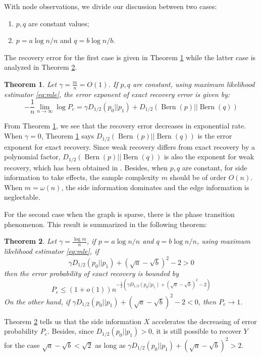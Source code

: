 \documentclass[conference]{IEEEtran}
\newtheorem{theorem}{Theorem}
\DeclareMathOperator{\Bern}{Bern}
\begin{document}
With node observations, we divide our discussion between two cases:
\begin{enumerate}
\item $p,q$ are constant values;
\item $p = a \log n /n$ and $q = b \log n / b$.
\end{enumerate}
The recovery error for the first case is given in Theorem \ref{thm:constant} while
the latter case is analyzed in Theorem \ref{thm:Pe}.
\begin{theorem}\label{thm:constant}
	Let $\gamma = \frac{m}{n} = O(1)$. If $p,q$ are constant, using maximum likelihood estimator \eqref{eq:mle},
	the error exponent of exact recovery error is given by:
	\begin{equation}
	-\frac{1}{n}\lim_{n\to \infty} \log P_e =  \gamma D_{1/2}(p_0 || p_1) + D_{1/2}(\Bern(p)||\Bern(q))
	\end{equation} 
\end{theorem}
From Theorem \ref{thm:constant}, we see that the recovery error decreases in exponential rate.
When $\gamma=0$, Theorem \ref{thm:constant} says $D_{1/2}(\Bern(p)||\Bern(q))$
is the error exponent for exact recovery. Since weak recovery differs from exact recovery by a polynomial factor, $D_{1/2}(\Bern(p)||\Bern(q))$ is also the exponent for weak recovery, which has been obtained
in \cite{zhang2016}. Besides, when $p,q$ are constant, for side information to take effects, the sample complexity $m$ should be of order $O(n)$. When $m=\omega(n)$, the side information dominates and the edge information is neglectable.

For the second case when the graph is sparse, there is the phase transition phenomenon. This result
is summarized
in the following theorem:
\begin{theorem}\label{thm:Pe}
Let $\gamma = \frac{\log m}{n}$, if $p = a \log n /n$ and $q = b \log n / n$, using maximum likelihood estimator \eqref{eq:mle},
if
\begin{equation}\label{eq:positive_condition}
\gamma D_{1/2}(p_0||p_1) + (\sqrt{a} - \sqrt{b})^2-2 > 0
\end{equation}
then the error probability
of exact recovery is bounded by
\begin{equation}\label{eq:PeMain}
    P_e \leq (1+o(1)) n^{-\frac{1}{2}\left(\gamma D_{1/2}(p_0||p_1) + (\sqrt{a} - \sqrt{b})^2-2\right)}
\end{equation}
On the other hand, if $\gamma D_{1/2}(p_0||p_1) + (\sqrt{a} - \sqrt{b})^2-2 < 0$,
then $P_e \to 1$.
\end{theorem}
Theorem \ref{thm:Pe} tells us that the side information $X$ accelerates the
decreasing of error probability $P_e$. Besides, since 
$D_{1/2}(p_0||p_1) > 0$, it is still possible to recover $Y$
for the case $\sqrt{a} - \sqrt{b} < \sqrt{2}$ as long as $\gamma D_{1/2}(p_0||p_1) + (\sqrt{a} - \sqrt{b})^2 > 2$.
\end{document}
